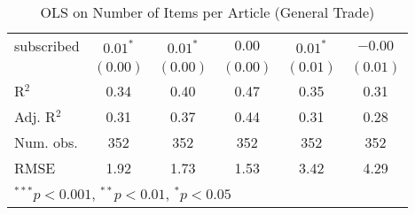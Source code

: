 \begin{table}[!h]
\begin{center}
\begin{tabular}{l c c c c c }
subscribed              & $0.01^{*}$   & $0.01^{*}$   & $0.00$       & $0.01^{*}$   & $-0.00$      \\
                        & $(0.00)$     & $(0.00)$     & $(0.00)$     & $(0.01)$     & $(0.01)$     \\
\midrule
R$^2$                   & 0.34         & 0.40         & 0.47         & 0.35         & 0.31         \\
Adj. R$^2$              & 0.31         & 0.37         & 0.44         & 0.31         & 0.28         \\
Num. obs.               & 352          & 352          & 352          & 352          & 352          \\
RMSE                    & 1.92         & 1.73         & 1.53         & 3.42         & 4.29         \\
\bottomrule
\multicolumn{6}{l}{\scriptsize{$^{***}p<0.001$, $^{**}p<0.01$, $^*p<0.05$}}
\end{tabular}
\caption{OLS on Number of Items per Article (General Trade)}
\label{table:coefficients}
\end{center}
\end{table}
